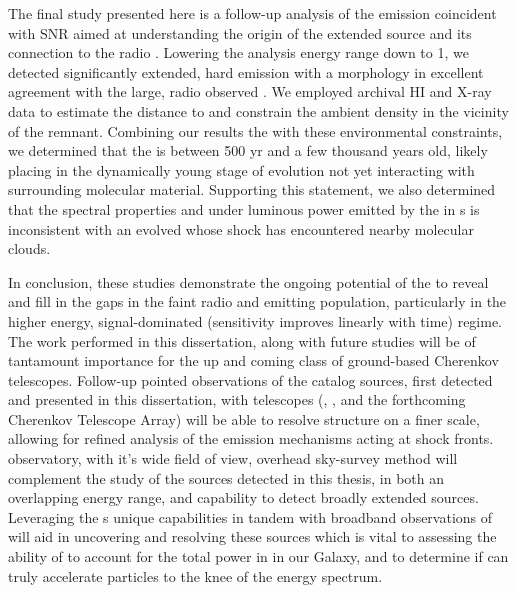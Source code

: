 The final study presented here is a follow-up analysis of the \gam{} emission coincident with SNR \Gone{} aimed at understanding the origin of the extended \gam{} source and its connection to the radio \snr{}. Lowering the analysis energy range down to 1\gev{}, we detected significantly extended,  hard \gam{} emission with a morphology in excellent agreement with the large, radio observed \snr{}. We employed archival HI and X-ray data to estimate the distance to \Gone{}  and constrain the ambient density in the vicinity of the remnant. Combining our\gev{} results the with these environmental constraints, we determined that the \snr{} is between 500 yr and a few thousand years old, likely placing \Gone{} in the dynamically young stage of evolution \ie{} not yet interacting with surrounding molecular material. Supporting this statement, we also determined that the spectral properties and under luminous power emitted by the \snr{} in \gam{}s is inconsistent with an evolved \snr{} whose shock has encountered nearby molecular clouds. 

In conclusion, these studies demonstrate the ongoing potential of the \lat{} to reveal and fill in the gaps in the faint radio and \gam{} emitting \snr{} population, particularly in the higher energy, signal-dominated (\ie{}sensitivity improves linearly with time) regime. The work performed in this dissertation, along with future \lat{} \snr{} studies will be of tantamount importance for the up and coming class of ground-based Cherenkov telescopes. Follow-up pointed observations of the  catalog sources, first detected and presented in this dissertation, with\tev{} telescopes (\veritas{}, \hess{}, and the forthcoming Cherenkov Telescope Array) will be able to resolve structure on a finer scale, allowing for refined analysis of the \gam{} emission mechanisms acting at \snr{} shock fronts. \hawc{} observatory, with it's wide field of view, overhead sky-survey method will complement the study of the sources detected in this thesis, in both an overlapping energy range, and capability to detect broadly extended sources. Leveraging the \lat{}s unique capabilities in tandem with broadband observations of \snrs{} will aid in uncovering and resolving these \gam{} sources which is vital to assessing the ability of \snrs{} to account for the total power in \crs{} in our Galaxy, and to determine if \snrs{} can truly accelerate particles to the knee of the \cray{} energy spectrum. 





